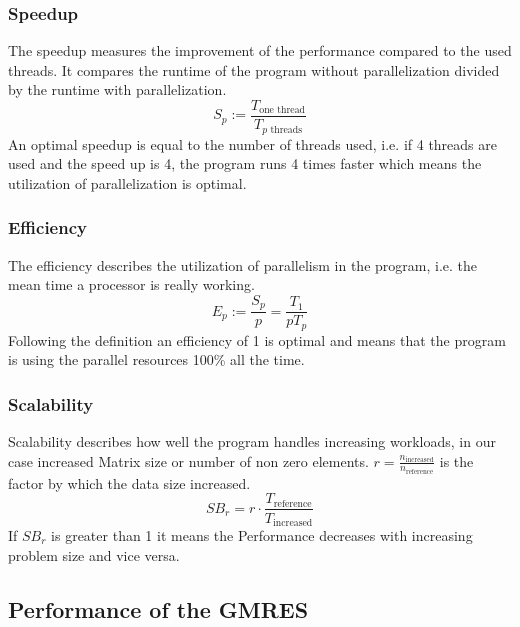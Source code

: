 \documentclass{article}
\begin{document}
\subsubsection{Speedup}
The speedup measures the improvement of the performance compared to the used threads. It compares the runtime of the program without parallelization divided by the runtime with parallelization. 
$$
S_p := \frac{T_{\text{one thread}}}{T_{p \text{ threads}}}
$$
An optimal speedup is equal to the number of threads used, i.e. if 4 threads are used and the speed up is 4, the program runs 4 times faster which means the utilization of parallelization is optimal.
\subsubsection{Efficiency}
The efficiency describes the utilization of parallelism in the program, i.e. the mean time a processor is really working.
$$
E_p := \frac{S_p}{p} = \frac{T_{1}}{p T_{p}}
$$
Following the definition an efficiency of 1 is optimal and means that the program is using the parallel resources 100\% all the time.
\subsubsection{Scalability}
Scalability describes how well the program handles increasing workloads, in our case increased Matrix size or number of non zero elements. $r = \frac{n_{\text{increased}}}{n_{\text{reference}}} $ is the factor by which the data size increased.
$$
SB_r = r\cdot \frac{T_{\text{reference}}}{T_{\text{increased}}}
$$
If $SB_r$ is greater than 1 it means the Performance decreases with increasing problem size and vice versa.
\subsection{Performance of the GMRES}
\end{document}
